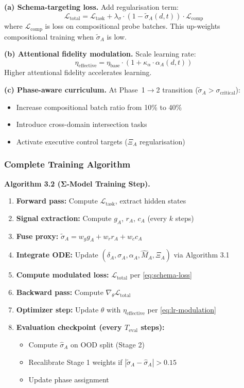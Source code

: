 \documentclass[11pt,a4paper]{article}
\begin{document}
\textbf{(a) Schema-targeting loss.} Add regularisation term:
\begin{equation}\label{eq:schema-loss}
\mathcal{L}_{\text{total}} = \mathcal{L}_{\text{task}} + \lambda_\sigma \cdot (1 - \tilde{\sigma}_A(d,t)) \cdot \mathcal{L}_{\text{comp}}
\end{equation}
where $\mathcal{L}_{\text{comp}}$ is loss on compositional probe batches.
This up-weights compositional training when $\tilde{\sigma}_A$ is low.

\textbf{(b) Attentional fidelity modulation.} Scale learning rate:
\begin{equation}\label{eq:lr-modulation}
\eta_{\text{effective}} = \eta_{\text{base}} \cdot (1 + \kappa_\alpha \cdot \alpha_A(d,t))
\end{equation}
Higher attentional fidelity accelerates learning.

\textbf{(c) Phase-aware curriculum.} At Phase~1$\to$2 transition
($\tilde{\sigma}_A > \sigma_{\text{critical}}$):
\begin{itemize}[nosep]
\item Increase compositional batch ratio from 10\% to 40\%
\item Introduce cross-domain intersection tasks
\item Activate executive control targets ($\Xi_A$ regularisation)
\end{itemize}

\subsubsection{Complete Training Algorithm}

\textbf{Algorithm 3.2 (Σ-Model Training Step).}
\begin{enumerate}[nosep]
\item \textbf{Forward pass:} Compute $\mathcal{L}_{\text{task}}$, extract hidden states
\item \textbf{Signal extraction:} Compute $g_A$, $r_A$, $c_A$ (every $k$ steps)
\item \textbf{Fuse proxy:} $\tilde{\sigma}_A = w_g g_A + w_r r_A + w_c c_A$
\item \textbf{Integrate ODE:} Update $(\delta_A, \sigma_A, \alpha_A, \hat{M}_A, \Xi_A)$ via Algorithm 3.1
\item \textbf{Compute modulated loss:} $\mathcal{L}_{\text{total}}$ per \eqref{eq:schema-loss}
\item \textbf{Backward pass:} Compute $\nabla_\theta \mathcal{L}_{\text{total}}$
\item \textbf{Optimizer step:} Update $\theta$ with $\eta_{\text{effective}}$ per \eqref{eq:lr-modulation}
\item \textbf{Evaluation checkpoint (every $T_{\text{eval}}$ steps):}
  \begin{itemize}[nosep]
  \item Compute $\hat{\sigma}_A$ on OOD split (Stage 2)
  \item Recalibrate Stage 1 weights if $|\tilde{\sigma}_A - \hat{\sigma}_A| > 0.15$
  \item Update phase assignment
  \end{itemize}
\end{enumerate}
\end{document}
